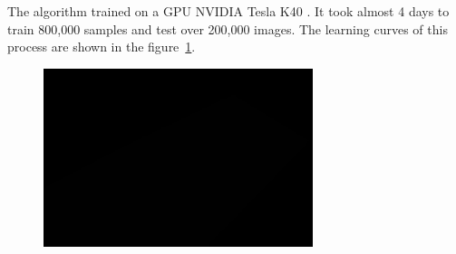 
\noindent The algorithm trained on a GPU NVIDIA \cite{kirk2007nvidia} Tesla K40 \cite{lindholm2008nvidia}. It took almost 4 days to train 800,000 samples and test over 200,000 images. The learning curves of this process are shown in the figure~\ref{fig:curve}.

\begin{figure}[H]
	\centering
	{\includegraphics[width=0.7\textwidth]{images/1}}
	\caption{}
	\label{fig:curve}
\end{figure}

